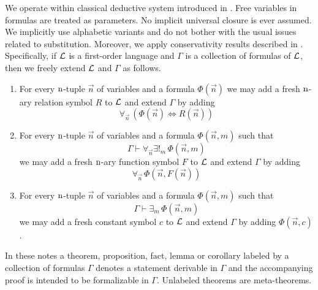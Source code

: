 \documentclass[10pt]{amsart}
\newcommand{\mforall}{\boldsymbol{\forall}}
\newcommand{\mexists}{\boldsymbol{\exists}}
\newcommand{\mequiv}{\boldsymbol{\Leftrightarrow}}
\begin{document}
We operate within classical deductive system introduced in \cite{Systems_of_first_order_logic}. Free variables in formulas are treated as parameters. No implicit universal closure is ever assumed. We implicitly use alphabetic variants and do not bother with the usual issues related to substitution. Moreover, we apply conservativity results described in \cite{Systems_of_first_order_logic}. Specifically, if ${\mathcal L}$ is a first-order language and $\Gamma$ is a collection of formulas of ${\mathcal L}$, then we freely extend ${\mathcal L}$ and $\Gamma$ as follows.
\begin{enumerate}[label=\textbf{\arabic*.}, leftmargin=3.0em]
  \item For every $\rm{n}$-tuple $\vec{n}$ of variables and a formula $\Phi(\vec{n})$ we may add a fresh $\rm{n}$-ary relation symbol $R$ to ${\mathcal L}$ and extend $\Gamma$ by adding
	      $$\mforall_{\vec{n}}\,\left(\Phi(\vec{n}) \mequiv R(\vec{n})\right)$$
	\item For every $\rm{n}$-tuple $\vec{n}$ of variables and a formula $\Phi(\vec{n},m)$ such that
	      $$\Gamma \vdash \mforall_{\vec{n}}\mexists!_m\,\Phi(\vec{n},m)$$
	      we may add a fresh $\rm{n}$-ary function symbol $F$ to ${\mathcal L}$ and extend $\Gamma$ by adding
	      $$\mforall_{\vec{n}}\,\Phi(\vec{n},F(\vec{n}))$$
	\item For every $\rm{n}$-tuple $\vec{n}$ of variables and a formula $\Phi(\vec{n},m)$ such that
	      $$\Gamma \vdash \mexists_m\,\Phi(\vec{n},m)$$
	      we may add a fresh constant symbol $c$ to ${\mathcal L}$ and extend $\Gamma$ by adding $\Phi(\vec{n},c)$.
\end{enumerate}
\noindent
In these notes a theorem, proposition, fact, lemma or corollary labeled by a collection of formulas $\Gamma$ denotes a statement derivable in $\Gamma$ and the accompanying proof is intended to be formalizable in $\Gamma$. Unlabeled theorems are meta-theorems.
\end{document}
